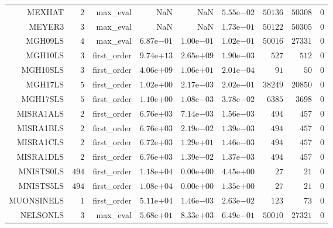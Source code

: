 \begin{longtable}{rrrrrrrrr}
MEXHAT & \(     2\) & max\_eval &       NaN &       NaN & \( 5.55\)e\(-02\) & \( 50136\) & \( 50308\) & \(     0\) \\
MEYER3 & \(     3\) & max\_eval &       NaN &       NaN & \( 1.73\)e\(-01\) & \( 50122\) & \( 50305\) & \(     0\) \\
MGH09LS & \(     4\) & max\_eval & \( 6.87\)e\(-01\) & \( 1.00\)e\(-01\) & \( 1.02\)e\(-01\) & \( 50016\) & \( 27331\) & \(     0\) \\
MGH10LS & \(     3\) & first\_order & \( 9.74\)e\(+13\) & \( 2.65\)e\(+09\) & \( 1.90\)e\(-03\) & \(   527\) & \(   512\) & \(     0\) \\
MGH10SLS & \(     3\) & first\_order & \( 4.06\)e\(+09\) & \( 1.06\)e\(+01\) & \( 2.01\)e\(-04\) & \(    91\) & \(    50\) & \(     0\) \\
MGH17LS & \(     5\) & first\_order & \( 1.02\)e\(+00\) & \( 2.17\)e\(-03\) & \( 2.02\)e\(-01\) & \( 38249\) & \( 20850\) & \(     0\) \\
MGH17SLS & \(     5\) & first\_order & \( 1.10\)e\(+00\) & \( 1.08\)e\(-03\) & \( 3.78\)e\(-02\) & \(  6385\) & \(  3698\) & \(     0\) \\
MISRA1ALS & \(     2\) & first\_order & \( 6.76\)e\(+03\) & \( 7.14\)e\(-03\) & \( 1.56\)e\(-03\) & \(   494\) & \(   457\) & \(     0\) \\
MISRA1BLS & \(     2\) & first\_order & \( 6.76\)e\(+03\) & \( 2.19\)e\(-02\) & \( 1.39\)e\(-03\) & \(   494\) & \(   457\) & \(     0\) \\
MISRA1CLS & \(     2\) & first\_order & \( 6.72\)e\(+03\) & \( 1.29\)e\(+01\) & \( 1.46\)e\(-03\) & \(   494\) & \(   457\) & \(     0\) \\
MISRA1DLS & \(     2\) & first\_order & \( 6.76\)e\(+03\) & \( 1.39\)e\(-02\) & \( 1.37\)e\(-03\) & \(   494\) & \(   457\) & \(     0\) \\
MNISTS0LS & \(   494\) & first\_order & \( 1.18\)e\(+04\) & \( 0.00\)e\(+00\) & \( 4.45\)e\(+00\) & \(    27\) & \(    21\) & \(     0\) \\
MNISTS5LS & \(   494\) & first\_order & \( 1.08\)e\(+04\) & \( 0.00\)e\(+00\) & \( 1.35\)e\(+00\) & \(    27\) & \(    21\) & \(     0\) \\
MUONSINELS & \(     1\) & first\_order & \( 5.11\)e\(+04\) & \( 1.46\)e\(-03\) & \( 2.63\)e\(-02\) & \(   123\) & \(    73\) & \(     0\) \\
NELSONLS & \(     3\) & max\_eval & \( 5.68\)e\(+01\) & \( 8.33\)e\(+03\) & \( 6.49\)e\(-01\) & \( 50010\) & \( 27321\) & \(     0\) \\

\end{longtable}
